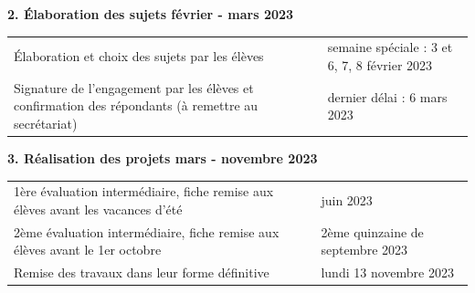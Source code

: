 \documentclass[
  10pt,
  french,
  a5paper,
  openany]{book}
\begin{document}

\textbf{2. Élaboration des sujets \hfill février - mars 2023}

\begin{longtable}[]{@{}ll@{}}
\toprule
\endhead
\begin{minipage}[t]{0.65\columnwidth}\raggedright
Élaboration et choix des sujets par les élèves\strut
\end{minipage} & \begin{minipage}[t]{0.29\columnwidth}\raggedright
semaine spéciale : 3 et 6, 7, 8 février 2023\strut
\end{minipage}\tabularnewline
\begin{minipage}[t]{0.65\columnwidth}\raggedright
Signature de l'engagement par les élèves et confirmation des répondants (à remettre au secrétariat)\strut
\end{minipage} & \begin{minipage}[t]{0.29\columnwidth}\raggedright
dernier délai : 6 mars 2023\strut
\end{minipage}\tabularnewline
\bottomrule
\end{longtable}


\clearpage


\textbf{3. Réalisation des projets \hfill mars - novembre 2023}

\begin{longtable}[]{@{}ll@{}}
\toprule
\endhead
\begin{minipage}[t]{0.67\columnwidth}\raggedright
1ère évaluation intermédiaire, fiche remise aux élèves avant les vacances d'été\strut
\end{minipage} & \begin{minipage}[t]{0.27\columnwidth}\raggedright
juin 2023\strut
\end{minipage}\tabularnewline
\begin{minipage}[t]{0.67\columnwidth}\raggedright
2ème évaluation intermédiaire, fiche remise aux élèves avant le 1er octobre\strut
\end{minipage} & \begin{minipage}[t]{0.27\columnwidth}\raggedright
2ème quinzaine de septembre 2023\strut
\end{minipage}\tabularnewline
\begin{minipage}[t]{0.67\columnwidth}\raggedright
Remise des travaux dans leur forme définitive\strut
\end{minipage} & \begin{minipage}[t]{0.27\columnwidth}\raggedright
lundi 13 novembre 2023\strut
\end{minipage}\tabularnewline
\bottomrule
\end{longtable}
\end{document}

